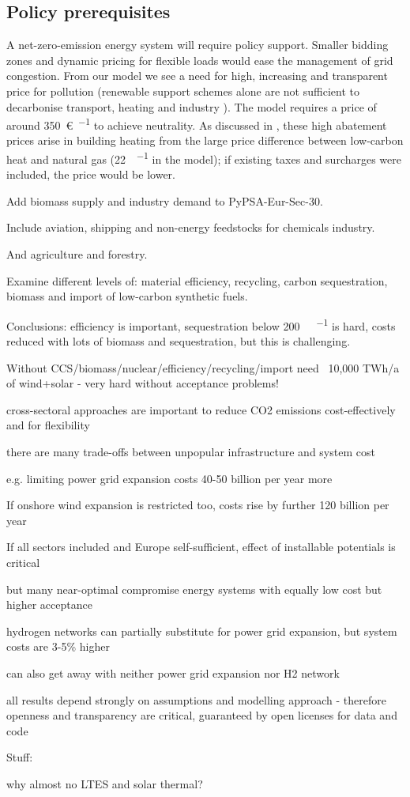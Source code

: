 \subsection*{Policy prerequisites}

A net-zero-emission energy system will require policy support.
Smaller bidding zones and dynamic pricing for flexible loads would
ease the management of grid congestion. From our model we see a need
for high, increasing and transparent price for \co pollution
(renewable support schemes alone are not sufficient to decarbonise
transport, heating and industry \cite{zhuImpactCO22018}). The model requires
a \co price of around \SI{350}{\euro\per\tco} to achieve \co
neutrality. As discussed in \cite{brownSynergiesSector2018}, these high abatement
prices arise in building heating from the large price difference
between low-carbon heat and natural gas (\SI{22}{\sieuro\per\mwh} in the model);
if existing taxes and surcharges were included, the \co price would
be lower.



Add biomass supply and industry demand to PyPSA-Eur-Sec-30.

Include aviation, shipping and non-energy feedstocks for chemicals industry.

And agriculture and forestry.

Examine different levels of: material efficiency, recycling, carbon
sequestration, biomass and import of low-carbon synthetic fuels.

Conclusions: efficiency is important, sequestration below \SI{200}{\mega\tco\per\year} is hard,
costs reduced with lots of biomass and sequestration, but this is challenging.

Without CCS/biomass/nuclear/efficiency/recycling/import need ~10,000 TWh/a of
wind+solar - very hard without acceptance problems!

cross-sectoral approaches are important to reduce CO2 emissions cost-effectively and for flexibility

there are many trade-offs between unpopular infrastructure and system cost

e.g. limiting power grid expansion costs 40-50 billion per year more

If onshore wind expansion is restricted too, costs rise by further 120 billion per year

If all sectors included and Europe self-sufficient, effect of installable potentials is critical

but many near-optimal compromise energy systems with equally low cost but higher acceptance

hydrogen networks can partially substitute for power grid expansion, but system costs are
3-5\% higher

can also get away with neither power grid expansion nor H2 network

all results depend strongly on assumptions and modelling approach
- therefore openness and transparency are critical, guaranteed by open licenses for data and code

Stuff:

why almost no LTES and solar thermal?